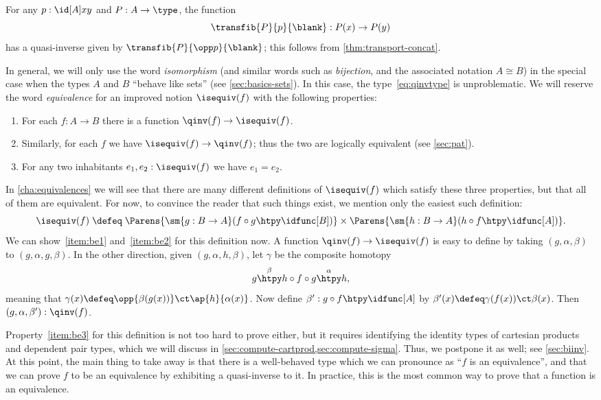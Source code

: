 \begin{eg}\label{thm:transportequiv}
  For any $p:\id[A]xy$ and $P:A\to\type$, the function
  \[\transfib{P}{p}{\blank}:P(x) \to P(y)\]
  has a quasi-inverse given by $\transfib{P}{\opp p}{\blank}$; this follows from \narrowbreak \cref{thm:transport-concat}.
\end{eg}

In general, we will only use the word \emph{isomorphism}
(and similar words such as \emph{bijection}, and the associated notation $A\cong B$)
in the special case when the types $A$ and $B$ ``behave like sets'' (see \cref{sec:basics-sets}).
In this case, the type~\eqref{eq:qinvtype} is unproblematic.
We will reserve the word \emph{equivalence} for an improved notion $\isequiv (f)$ with the following properties:%
\begin{enumerate}
\item For each $f:A\to B$ there is a function $\qinv(f) \to \isequiv (f)$.\label{item:be1}
\item Similarly, for each $f$ we have $\isequiv (f) \to \qinv(f)$; thus the two are logically equivalent (see \cref{sec:pat}).\label{item:be2}
\item For any two inhabitants $e_1,e_2:\isequiv(f)$ we have $e_1=e_2$.\label{item:be3}
\end{enumerate}
In \cref{cha:equivalences} we will see that there are many different definitions of $\isequiv(f)$ which satisfy these three properties, but that all of them are equivalent.
For now, to convince the reader that such things exist, we mention only the easiest such definition:
\begin{equation}\label{eq:isequiv-invertible}
  \isequiv(f) \;\defeq\;
  \Parens{\sm{g:B\to A} (f\circ g \htpy \idfunc[B])}
  \times
  \Parens{\sm{h:B\to A} (h\circ f \htpy \idfunc[A])}.
\end{equation}
We can show~\ref{item:be1} and~\ref{item:be2} for this definition now.
A function $\qinv(f) \to \isequiv (f)$ is easy to define by taking $(g,\alpha,\beta)$ to $(g,\alpha,g,\beta)$.
In the other direction, given $(g,\alpha,h,\beta)$, let $\gamma$ be the composite homotopy
\[ g \overset{\beta}{\htpy} h\circ f\circ g \overset{\alpha}{\htpy} h, \]
meaning that $\gamma(x) \defeq \opp{\beta(g(x))} \ct \ap{h}{\alpha(x)}$.
Now define $\beta':g\circ f\htpy \idfunc[A]$ by $\beta'(x) \defeq \gamma(f(x)) \ct \beta(x)$.
Then $(g,\alpha,\beta'):\qinv(f)$.

Property~\ref{item:be3} for this definition is not too hard to prove either, but it requires identifying the identity types of cartesian products and dependent pair types, which we will discuss in \cref{sec:compute-cartprod,sec:compute-sigma}.
Thus, we postpone it as well; see \cref{sec:biinv}.
At this point, the main thing to take away is that there is a well-behaved type which we can pronounce as ``$f$ is an equivalence'', and that we can prove $f$ to be an equivalence by exhibiting a quasi-inverse to it.
In practice, this is the most common way to prove that a function is an equivalence.

